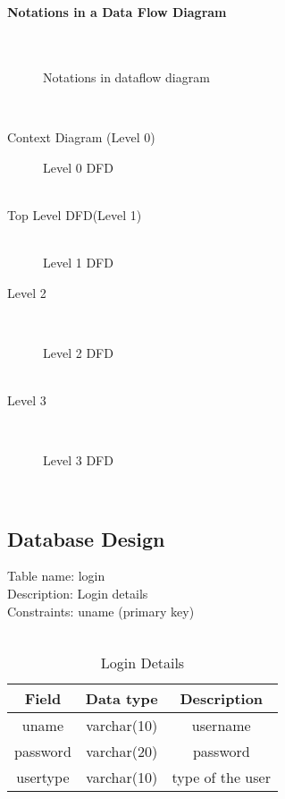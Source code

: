 \textbf{Notations in a Data Flow Diagram}\\

\\ \\
\begin{figure}[ht] 
\caption{Notations in dataflow diagram}
\end{figure} \\

\newpage


Context Diagram (Level 0) \\
\begin{figure}[ht]
{} 
\caption{Level 0 DFD}
\end{figure}\\



Top Level DFD(Level 1)\\
\\
\begin{figure}[ht]
{}
\caption{Level 1 DFD}
\end{figure}

\newpage

Level 2\\
\begin{figure}[ht]
{}\\
\caption{Level 2 DFD }
\end{figure}\\

Level 3\\
\begin{figure}[ht]
{}\\
\caption{Level 3 DFD}
\end{figure}\\

\newpage
\subsection{Database Design}

Table name: login\\
Description: Login details\\
Constraints: uname (primary key)\\
\\
\begin{table}[ht]
\begin{tabular}{|c|c|c|} 
\hline
Field  & Data type & Description \\  
\hline
uname& varchar(10)& username \\ 
\hline
password &  varchar(20) & password \\
\hline
usertype &  varchar(10) & type of the user \\
\hline
\end{tabular}
\caption{Login Details }
\end{table}


